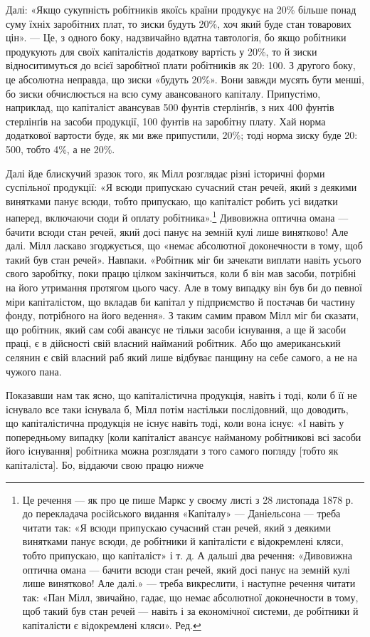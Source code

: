 \parcont{}  %
Далі: «Якщо сукупність робітників якоїсь країни продукує
на 20\% більше понад суму їхніх заробітних плат, то зиски будуть
20\%, хоч який буде стан товарових цін». — Це, з одного
боку, надзвичайно вдатна тавтологія, бо якщо робітники продукують
для своїх капіталістів додаткову вартість у 20\%, то й зиски
відноситимуться до всієї заробітної плати робітників як 20: 100.
З другого боку, це абсолютна неправда, що зиски «будуть 20\%».
Вони завжди мусять бути менші, бо зиски обчислюється на всю
суму авансованого капіталу. Припустімо, наприклад, що капіталіст
авансував 500 фунтів стерлінґів, з них 400 фунтів стерлінґів
на засоби продукції, 100 фунтів на заробітну плату. Хай
норма додаткової вартости буде, як ми вже припустили, 20\%;
тоді норма зиску буде 20: 500, тобто 4\%, а не 20\%.

Далі йде блискучий зразок того, як Мілл розглядає різні
історичні форми суспільної продукції: «Я всюди припускаю
сучасний стан речей, який з деякими винятками панує всюди,
тобто припускаю, що капіталіст робить усі видатки наперед,
включаючи сюди й оплату робітника».\footnote*{
Це речення — як про це пише Маркс у своєму листі з 28 листопада
1878 р. до перекладача російського видання «Капіталу» — Даніельсона —
треба читати так: «Я всюди припускаю сучасний стан речей, який з деякими
винятками панує всюди, де робітники й капіталісти є відокремлені
кляси, тобто припускаю, що капіталіст» і т. д. А дальші два речення:
«Дивовижна оптична омана — бачити всюди стан речей, який досі
панує на земній кулі лише винятково! Але далі.» — треба викреслити, і
наступне речення читати так: «Пан Мілл, звичайно, гадає, що немає
абсолютної доконечности в тому, щоб такий був стан речей — навіть
і за економічної системи, де робітники й капіталісти є відокремлені
кляси». Ред.
} Дивовижна оптична
омана — бачити всюди стан речей, який досі панує на земній
кулі лише винятково! Але далі. Мілл ласкаво згоджується, що
«немає абсолютної доконечности в тому, щоб такий був стан
речей». Навпаки. «Робітник міг би зачекати виплати навіть
усього свого заробітку, поки працю цілком закінчиться, коли б
він мав засоби, потрібні на його утримання протягом цього часу.
Але в тому випадку він був би до певної міри капіталістом, що
вкладав би капітал у підприємство й постачав би частину фонду,
потрібного на його ведення». З таким самим правом Мілл міг би
сказати, що робітник, який сам собі авансує не тільки засоби
існування, а ще й засоби праці, є в дійсності свій власний найманий
робітник. Або що американський селянин є свій власний
раб який лише відбуває панщину на себе самого, а не на чужого
пана.

Показавши нам так ясно, що капіталістична продукція, навіть
і тоді, коли б її не існувало все таки існувала б, Мілл потім
настільки послідовний, що доводить, що капіталістична продукція
не існує навіть тоді, коли вона існує: «І навіть у попередньому
випадку [коли капіталіст авансує найманому робітникові всі
засоби його існування] робітника можна розглядати з того самого
погляду [тобто як капіталіста]. Бо, віддаючи свою працю нижче
\parbreak{}  %
